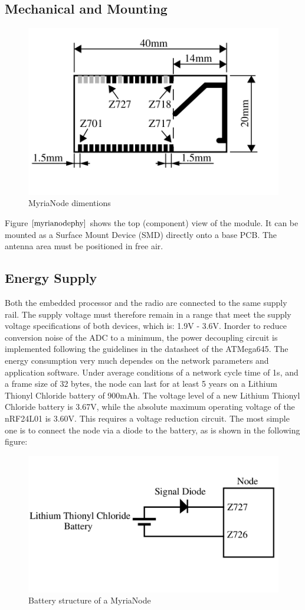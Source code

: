 \documentclass[a4paper,11pt]{report}
\begin{document}
\subsection{Mechanical and Mounting}
\begin{figure}[!h]
 \centering
 \includegraphics[width= 0.7 \textwidth]{myrianodephy}
 \caption{MyriaNode dimentions}
 \label{myrianodephy}
\end{figure}
Figure $\ref{myrianodephy}$ shows the top (component) view of the module. It can be mounted as a Surface Mount Device (SMD) directly onto a base PCB. The antenna area must be positioned in free air.
\subsection{Energy Supply}
Both the embedded processor and the radio are connected to the same supply rail. The supply voltage must therefore remain in a range that meet the supply voltage specifications of both devices, which is: 1.9V - 3.6V. \newline
Inorder to reduce conversion noise of the ADC to a minimum, the power decoupling circuit is implemented following the guidelines in the datasheet of the ATMega645. \newline
The energy consumption very much dependes on the network parameters and application software. Under average conditions of a network cycle time of 1s, and a frame size of 32 bytes, the node can last for at least 5 years on a Lithium Thionyl Chloride battery of 900mAh. \newline
The voltage level of a new Lithium Thionyl Chloride battery is 3.67V, while the absolute maximum operating voltage of the nRF24L01 is 3.60V. This requires a voltage reduction circuit. The most simple one is to connect the node via a diode to the battery, as is shown in the following figure:
\begin{figure}[!h]
 \centering
 \includegraphics[width = 0.5 \textwidth]{battery}
 \caption{Battery structure of a MyriaNode}
 \label{battery}
\end{figure}
\end{document}
